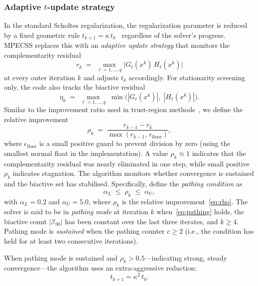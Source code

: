 \subsubsection{Adaptive $t$-update strategy}
\label{sec:adaptive_t}
In the standard Scholtes regularization, the regularization parameter is
reduced by a fixed geometric rule $t_{k+1} = \kappa \, t_k$~\cite{Scholtes2001}
regardless of the solver's progress. MPECSS replaces this with an
\emph{adaptive update strategy} that monitors the
complementarity residual
\begin{equation}
  r_k \;=\; \max_{\ell = 1,\ldots,q} \bigl|G_\ell(x^k)\,H_\ell(x^k)\bigr|
  \label{eq:comp_res}
\end{equation}
at every outer iteration $k$ and adjusts $t_k$ accordingly. For
stationarity screening only, the code also tracks the biactive
residual
\begin{equation}
  \eta_k \;=\; \max_{\ell = 1,\ldots,q} \;\min\!\bigl(|G_\ell(x^k)|,\; |H_\ell(x^k)|\bigr).
  \label{eq:biactive_res}
\end{equation}
Similar to the improvement ratio used in trust-region methods~\cite{NocedalWright2006},
we define the relative improvement
\begin{equation}
  \rho_k \;=\; \frac{r_{k-1} - r_k}{\max(r_{k-1},\, \epsilon_{\mathrm{floor}})},
  \label{eq:rho}
\end{equation}
where $\epsilon_{\mathrm{floor}}$ is a small positive guard to prevent division by zero (using the smallest normal float in the implementation). A value $\rho_k \approx 1$ indicates that the complementarity residual was nearly eliminated in one step, while small positive $\rho_k$ indicates stagnation. The algorithm monitors whether convergence is sustained and the biactive set has stabilised. Specifically, define the \emph{pathing condition} as
\begin{equation}
  \alpha_L \;\le\; \rho_k \;\le\; \alpha_U,
  \label{eq:pathing}
\end{equation}
with $\alpha_L = 0.2$ and $\alpha_U = 5.0$, where $\rho_k$ is the relative improvement~\eqref{eq:rho}. The solver is said to be in \emph{pathing mode} at iteration $k$ when~\eqref{eq:pathing} holds, the biactive count $|\mathcal{I}_{00}|$ has been constant over the last three iterates, and $k \ge 4$. Pathing mode is \emph{sustained} when the pathing counter $c \ge 2$ (i.e., the condition has held for at least two consecutive iterations). 

 When pathing mode is sustained and $\rho_k > 0.5$---indicating strong, steady convergence---the algorithm uses an extra-aggressive reduction:
\begin{equation}
  t_{k+1} = \kappa^2 \, t_k.
  \label{eq:superlinear}
\end{equation}

